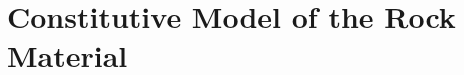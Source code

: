 \documentclass[a4paper,fleqn]{cas-sc}
\begin{document}


%	

\section{Constitutive Model of the Rock Material}\label{}
\end{document}
